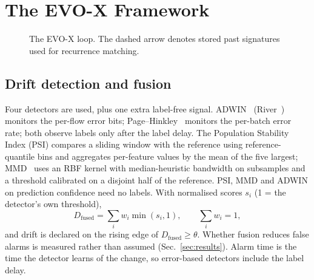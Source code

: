 \documentclass[conference]{IEEEtran}
\newcommand{\evox}{\textsc{EVO-X}}
\begin{document}
\section{The \evox{} Framework}
\label{sec:method}
\begin{figure}[t]
\centering
{}
\caption{The \evox{} loop. The dashed arrow denotes stored past signatures used for recurrence matching.}
\label{fig:arch}
\end{figure}

\subsection{Drift detection and fusion}
Four detectors are used, plus one extra label-free signal. ADWIN~\cite{bifet2007adwin} (River~\cite{montiel2021river}) monitors the per-flow error bits; Page--Hinkley~\cite{page1954ph} monitors the per-batch error rate; both observe labels only after the label delay. The Population Stability Index (PSI) compares a sliding window with the reference using reference-quantile bins and aggregates per-feature values by the mean of the five largest; MMD~\cite{gretton2012mmd} uses an RBF kernel with median-heuristic bandwidth on subsamples and a threshold calibrated on a disjoint half of the reference. PSI, MMD and ADWIN on prediction confidence need no labels. With normalised scores $s_i$ (1 = the detector's own threshold),
\begin{equation}
D_{\text{fused}}=\sum_i w_i\min(s_i,1),\qquad \sum_i w_i=1,
\end{equation}
and drift is declared on the rising edge of $D_{\text{fused}}\ge\theta$. Whether fusion reduces false alarms is measured rather than assumed (Sec.~\ref{sec:results}). Alarm time is the time the detector learns of the change, so error-based detectors include the label delay.
\end{document}
